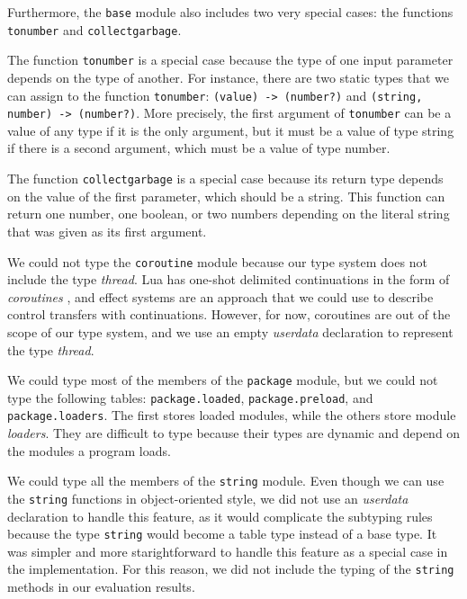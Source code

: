 Furthermore, the \texttt{base} module also includes two very
special cases: the functions \texttt{tonumber} and \texttt{collectgarbage}.

The function \texttt{tonumber} is a special case because the
type of one input parameter depends on the type of another.
For instance, there are two static types that we can
assign to the function \texttt{tonumber}:
\texttt{(value) -> (number?)} and
\texttt{(string, number) -> (number?)}.
More precisely, the first argument of \texttt{tonumber} can be
a value of any type if it is the only argument, but it must
be a value of type string if there is a second argument,
which must be a value of type number.

The function \texttt{collectgarbage} is a special case because
its return type depends on the value of the first parameter,
which should be a string.
This function can return one number, one boolean, or two numbers
depending on the literal string that was given as its first argument.

We could not type the \texttt{coroutine} module because our
type system does not include the type \emph{thread}.
Lua has one-shot delimited continuations \citep{james2011yield}
in the form of \emph{coroutines} \citep{moura2009rc}, and
effect systems \citep{nielson1999type} are an approach that we
could use to describe control transfers with continuations.
However, for now, coroutines are out of the scope of our type
system, and we use an empty \emph{userdata} declaration
to represent the type \emph{thread}.

We could type most of the members of the \texttt{package} module,
but we could not type the following tables: \texttt{package.loaded},
\texttt{package.preload}, and \texttt{package.loaders}.
The first stores loaded modules, while the others store module \emph{loaders}.
They are difficult to type because their types are dynamic and
depend on the modules a program loads.

We could type all the members of the \texttt{string} module.
Even though we can use the \texttt{string} functions in object-oriented style,
we did not use an \emph{userdata} declaration to handle this feature,
as it would complicate the subtyping rules because the type \texttt{string}
would become a table type instead of a base type.
It was simpler and more starightforward to handle this feature as a
special case in the implementation.
For this reason, we did not include the typing of the \texttt{string} methods
in our evaluation results.

